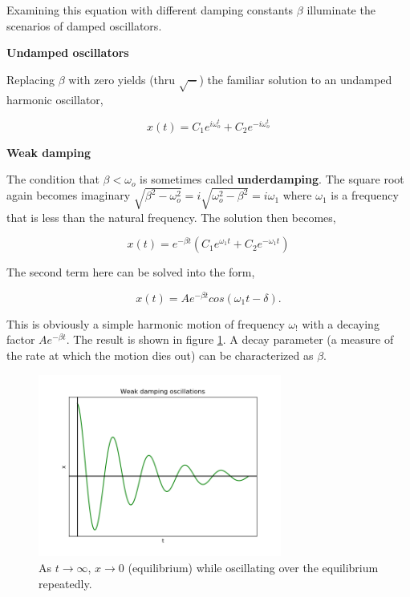 Examining this equation with different damping constants $\beta$ illuminate the scenarios of damped oscillators.


{\vspace{0.35cm} \bfseries \noindent Undamped oscillators}

Replacing $\beta$ with zero yields (thru $\sqrt{-}$) the familiar solution to an undamped harmonic oscillator,

\begin{equation*}
    x(t) = C_1 e^{i \omega_o^ t} + C_2 e^{-i \omega_o^ t}
\end{equation*}


{\vspace{0.35cm} \bfseries \noindent Weak damping}

The condition that $\beta < \omega_o$ is sometimes called {\bfseries underdamping}. The square root again becomes imaginary $\sqrt{\beta^2 - \omega_o^2} = i\sqrt{\omega_o^2 - \beta^2} = i \omega_1$ where $\omega_1$ is a frequency that is less than the natural frequency. The solution then becomes,

\begin{equation*}
    x(t) = e^{-\beta t} (C_1 e^{\omega_1 t} + C_2 e^{-\omega_1 t})
\end{equation*}

The second term here can be solved into the form,

\begin{equation*}
    x(t) = A e^{-\beta t} cos(\omega_1 t - \delta).
\end{equation*}

This is obviously a simple harmonic motion of frequency $\omega_!$ with a decaying factor $A e^{-\beta t}$. The result is shown in figure \ref{fig:weak_damped_osc}. A decay parameter (a measure of the rate at which the motion dies out) can be characterized as $\beta$.

\begin{figure}[h]
    \centering
    \includegraphics[width=8cm]{Classical_Mechanics/2.12-damp-osc/weak_damped_osc.png}
    \caption{As $t \rightarrow \infty$, $x \rightarrow 0$ (equilibrium) while oscillating over the equilibrium repeatedly.}
    \label{fig:weak_damped_osc}
\end{figure}


